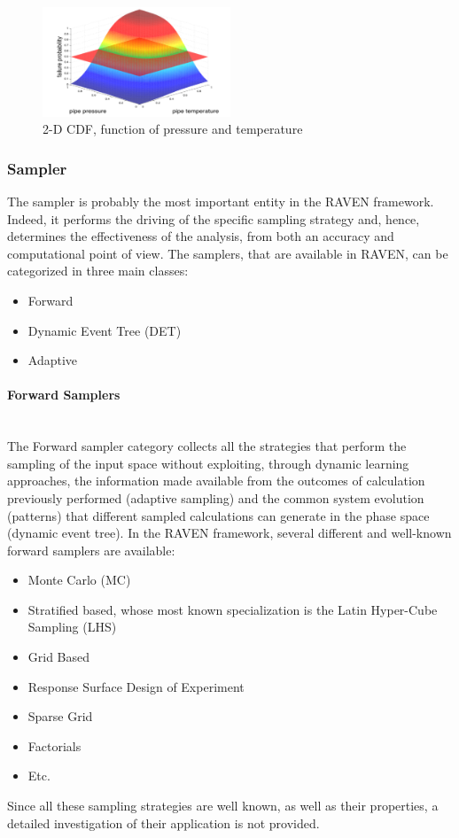 \begin{figure}
  \centering
  \includegraphics[width=0.5\textwidth]  {pics/NDimensionalDistributionExample.png}
  \caption{2-D CDF, function of pressure and temperature}
  \label{fig:NDDistributionExample}
\end{figure}

\subsubsection{Sampler}

The sampler is probably the most important entity in the RAVEN framework. Indeed, it performs the driving of the specific sampling strategy and, hence, determines the effectiveness of the analysis, from both an accuracy and computational point of view.  The samplers, that are available in RAVEN, can be categorized in three main classes:
\begin{itemize}
 \item Forward
 \item Dynamic Event Tree (DET)
 \item Adaptive
\end{itemize}
\paragraph{Forward Samplers} ~\\ 
The Forward sampler category collects all the strategies that perform the sampling of the input space without exploiting, through dynamic learning approaches, the information made available from the outcomes of calculation previously performed (adaptive sampling) and the common system evolution (patterns) that different sampled calculations can generate in the phase space (dynamic event tree). 
In the RAVEN framework, several different and well-known forward samplers are available:
\begin{itemize}
\item Monte Carlo (MC)
\item Stratified based, whose most known specialization is the Latin Hyper-Cube Sampling (LHS)
\item Grid Based
\item Response Surface Design of Experiment
\item Sparse Grid
\item Factorials
\item Etc.
\end{itemize}
Since all these sampling strategies are well known, as well as their properties, a detailed investigation of their application is not provided.
